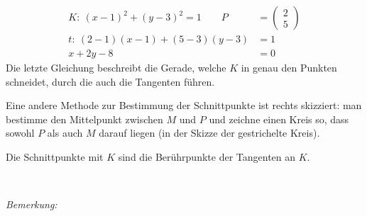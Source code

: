 \begin{minipage}{0.6\textwidth}
    \begin{align*}
        K: \ \left( x - 1 \right)^2 + \left( y - 3 \right)^2 = 1 \qquad P & =
        \begin{pmatrix}
            2\\ 5
        \end{pmatrix}\\
        t:\ \left( 2 - 1 \right)\left( x - 1 \right) + \left( 5 - 3 \right)\left( y - 3 \right) & = 1\\
        x + 2 y - 8 & = 0
    \end{align*}
    Die letzte Gleichung beschreibt die Gerade, welche $K$ in genau den Punkten schneidet, durch die auch die Tangenten führen.

    Eine andere Methode zur Bestimmung der Schnittpunkte ist rechts skizziert: man bestimme den Mittelpunkt zwischen $M$ und $P$ und zeichne einen Kreis so, dass sowohl $P$ als auch $M$ darauf liegen (in der Skizze der gestrichelte Kreis).

    Die Schnittpunkte mit $K$ sind die Berührpunkte der Tangenten an $K$.
\end{minipage}
\begin{minipage}{0.4\textwidth}
    \begin{center}
    \end{center}
\end{minipage}\ \medskip

\textit{Bemerkung:}

